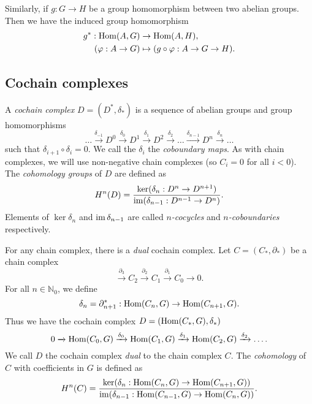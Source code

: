 Similarly, if $g: G \to H$ be a group homomorphism between two abelian groups. Then we have the induced group homomorphism
\begin{align*}
    g^*: \operatorname{Hom}(A, G)    & \to \operatorname{Hom}(A, H),                           \\
    (\varphi: A \to G) & \mapsto (g \circ \varphi: A \to G \to H). \\
\end{align*}

\subsection{Cochain complexes}

\begin{definition}
    A \emph{cochain complex} $D = (D^*, \delta_*)$ is a sequence of abelian groups and group homomorphisms
    \[
        \ldots
        \xrightarrow{\delta_{-1}} D^0
        \xrightarrow{\delta_{0}} D^1
        \xrightarrow{\delta_{1}} D^2
        \xrightarrow{\delta_2} \ldots
        \xrightarrow{\delta_{n-1}} D^n
        \xrightarrow{\delta_n} \ldots
    \]
    such that $\delta_{i+1} \circ \delta_i = 0$. We call the $\delta_i$ the \emph{coboundary maps}. As with chain complexes, we will use non-negative chain complexes (so $C_i = 0$ for all $i < 0$). The \emph{cohomology groups} of $D$ are defined as
    \[
        H^n(D) = \frac
        {\ker(\delta_n: D^n \to D^{n+1})}
        {\operatorname{im}(\delta_{n-1}: D^{n-1} \to D^n)}.
    \]
    Elements of $\ker\delta_n$ and $\operatorname{im}\delta_{n-1}$ are called \emph{$n$-cocycles} and \emph{$n$-coboundaries} respectively.
\end{definition}

For any chain complex, there is a \emph{dual} cochain complex. Let $C = (C_*, \partial_*)$ be a chain complex
\[
    \xrightarrow{\partial_3} C_2
    \xrightarrow{\partial_2} C_1
    \xrightarrow{\partial_1} C_0
    \xrightarrow{} 0.
\]
For all $n \in \mathbb N_0$, we define
\[
    \delta_n = \partial_{n+1}^*: \operatorname{Hom}(C_n, G) \to \operatorname{Hom}(C_{n+1}, G).
\]
Thus we have the cochain complex $D = (\operatorname{Hom}(C_*, G), \delta_*)$
\[
    0
    \xrightarrow{} \operatorname{Hom}(C_0, G)
    \xrightarrow{\delta_0} \operatorname{Hom}(C_1, G)
    \xrightarrow{\delta_1} \operatorname{Hom}(C_2, G)
    \xrightarrow{\delta_2} \ldots.
\]
We call $D$ the cochain complex \emph{dual} to the chain complex $C$. The \emph{cohomology} of $C$ with coefficients in $G$ is defined as
\[
    H^n(C) = \frac
    {\ker(\delta_n: \operatorname{Hom}(C_n, G) \to \operatorname{Hom}(C_{n+1}, G))}
    {\operatorname{im}(\delta_{n-1}: \operatorname{Hom}(C_{n-1}, G) \to \operatorname{Hom}(C_{n}, G))}.
\]

